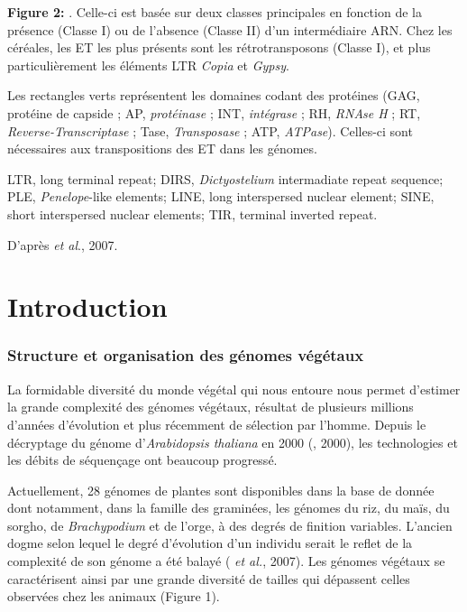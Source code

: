 \documentclass[a4paper, 12pt]{article}
\begin{document}
\begin{onehalfspace}
\begin{center}
\vspace{0.2cm}
\end{center}
\textbf{Figure 2:} . Celle-ci est basée sur deux classes principales en fonction de la présence (Classe I) ou de l'absence (Classe II) d'un intermédiaire ARN. Chez les céréales, les ET les plus présents sont les rétrotransposons (Classe I), et plus particulièrement les éléments LTR \textit{Copia} et \textit{Gypsy}.

Les rectangles verts représentent les domaines codant des protéines (GAG, protéine de capside ; AP, \textit{protéinase} ; INT, \textit{intégrase} ; RH, \textit{RNAse H} ; RT, \textit{Reverse-Transcriptase} ; Tase, \textit{Transposase} ; ATP, \textit{ATPase}). Celles-ci sont nécessaires aux transpositions des ET dans les génomes.

LTR, long terminal repeat; DIRS, \textit{Dictyostelium} intermadiate repeat sequence; PLE, \textit{Penelope}-like elements; LINE, long interspersed nuclear element; SINE, short interspersed nuclear elements; TIR, terminal inverted repeat.\\
\begin{flushright}
D'après  \textit{et al}., 2007.\\
\end{flushright}
\vfill
\addtocounter{page}{-1}
\newpage

\part{Introduction}
\section{Structure et organisation des génomes végétaux}
La formidable diversité du monde végétal qui nous entoure nous permet d'estimer la grande complexité des génomes végétaux, résultat de plusieurs millions d'années d'évolution et plus récemment de sélection par l'homme. Depuis le décryptage du génome d'\textit{Arabidopsis thaliana} en 2000 (, 2000), les technologies et les débits de séquençage ont beaucoup progressé.

Actuellement, 28 génomes de plantes sont disponibles dans la base de donnée  dont notamment, dans la famille des graminées, les génomes du riz, du maïs, du sorgho, de \textit{Brachypodium} et de l'orge, à des degrés de finition variables. L'ancien dogme selon lequel le degré d'évolution d'un individu serait le reflet de la complexité de son génome a été balayé ( \textit{et al.}, 2007). Les génomes végétaux se caractérisent ainsi par une grande diversité de tailles qui dépassent celles observées chez les animaux (Figure 1).


\end{onehalfspace}
\end{document}
